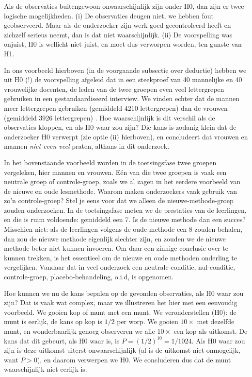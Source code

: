 \documentclass[
]{book}
\begin{document}
Als de observaties buitengewoon onwaarschijnlijk zijn onder H0, dan zijn
er twee logische mogelijkheden. (i) De observaties deugen niet, we
hebben fout geobserveerd. Maar als de onderzoeker zijn werk goed
gecontroleerd heeft en zichzelf serieus neemt, dan is dat niet
waarschijnlijk. (ii) De voorspelling was onjuist, H0 is wellicht niet
juist, en moet dus verworpen worden, ten gunste van H1.

In ons voorbeeld hierboven (in de voorgaande subsectie over deductie) hebben we uit H0 (!) de voorspelling afgeleid
dat in een steekproef van 40 mannelijke en 40 vrouwelijke docenten, de
leden van de twee groepen even veel lettergrepen gebruiken in een
gestandaardiseerd interview. We vinden echter dat de mannen meer lettergrepen gebruiken (gemiddeld 4210 lettergrepen) dan de vrouwen (gemiddeld 3926 lettergrepen) \citep[p.1112]{Quene08}.
Hoe
waarschijnlijk is dit verschil als de observaties kloppen, en als H0
waar zou zijn? Die kans is zodanig klein dat de onderzoeker H0 verwerpt
(zie optie (ii) hierboven), en concludeert dat vrouwen en mannen \emph{niet even veel} praten, althans in dit onderzoek.

In het bovenstaande voorbeeld worden in de toetsingsfase twee groepen
vergeleken, hier mannen en vrouwen. Eén van die twee groepen is vaak een
neutrale groep of controle-groep, zoals we al zagen in het eerdere
voorbeeld van de nieuwe en oude lesmethode. Waarom maken onderzoekers
vaak gebruik van zo'n controle-groep? Stel je eens voor dat we alleen de
nieuwe-methode-groep zouden onderzoeken. In de toetsingsfase meten we de
prestaties van de leerlingen, en die is ruim voldoende: gemiddeld een 7.
Is de nieuwe methode dan een succes? Misschien niet: als de leerlingen
volgens de oude methode een 8 zouden behalen, dan zou de nieuwe methode
eigenlijk slechter zijn, en zouden we de nieuwe methode beter niet
kunnen invoeren. Om daar een zinnige conclusie over te kunnen trekken,
is het essentieel om de nieuwe en oude methoden onderling te
vergelijken. Vandaar dat in veel onderzoek een neutrale conditie,
nul-conditie, controle-groep, placebo-behandeling, o.i.d, is opgenomen.

Hoe kunnen we nu de kans bepalen op de gevonden observaties, als H0 waar
zou zijn? Dat is vaak wat complex, maar we illustreren het hier met een
eenvoudig voorbeeld. We gooien kop of munt met een munt. We
veronderstellen (H0): de munt is eerlijk, de kans op kop is \(1/2\) per
worp. We gooien \(10\times\) met dezelfde munt, en wonderbaarlijk genoeg
observeren we alle \(10\times\) een kop als uitkomst. De kans dat dit
gebeurt, als H0 waar is, is \(P = (1/2)^{10} = 1/1024\). Als H0 waar zou
zijn is deze uitkomst uiterst onwaarschijnlijk (al is de uitkomst niet
onmogelijk, want \(P > 0\)), en daarom verwerpen we H0. We concluderen dus
dat de munt waarschijnlijk niet eerlijk is.
\end{document}
